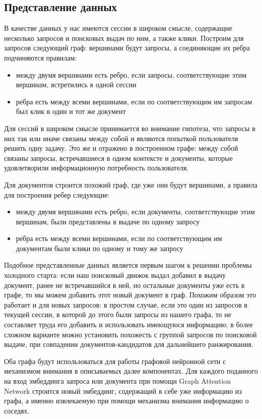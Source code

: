 \documentclass[diploma]{nanolab2015}
\begin{document}
\subsection{Представление данных}
В качестве данных у нас имеются сессии в широком смысле, содержащие несколько запросов и поисковых выдач по ним, а также клики. Построим для запросов следующий граф: вершинами будут запросы, а соединяющие их ребра подчиняются правилам:
\begin{itemize}
    \item между двумя вершинами есть ребро, если запросы, соответствующие этим вершинам, встретились в одной сессии
    \item ребра есть между всеми вершинами, если по соответствующим им запросам был клик в один и тот же документ
\end{itemize}

Для сессий в широком смысле принимается во внимание гипотеза, что запросы в них так или иначе связаны между собой и являются попыткой пользователя решить одну задачу. Это же и отражено в построенном графе: между собой связаны запросы, встречавшиеся в одном контексте и документы, которые удовлетворили информационную потребность пользователя.

Для документов строится похожий граф, где уже они будут вершинами, а правила для построения ребер следующие:
\begin{itemize}
    \item между двумя вершинами есть ребро, если документы, соответствующие этим вершинам, были представлены в выдаче по одному запросу
    \item ребра есть между всеми вершинами, если по соответствующим им документам были клики по одному и тому же запросу
\end{itemize}

Подобное представленные данных является первым шагом к решении проблемы холодного старта: если наш поисковый движок выдал добавил в выдачу документ, ранее не встречавшийся в ней, но остальные документы уже есть в графе, то мы можем добавить этот новый документ в граф. Похожим образом это работает и для новых запросов: в простом случае, если это один из запросов в текущей сессии, в которой до этого были запросы из нашего графа, то не составляет труда его добавить и использовать имеющуюся информацию; в более сложном варианте можно установить похожесть с группой запросов по поисковой выдаче, при совпадении документов-кандидатов для дальнейшего ранжирования.

Оба графа будут использоваться для работы графовой нейронной сети с механизмом внимания \cite{GAT} в описываемых далее компонентах. Для каждого поданного на вход эмбеддинга запроса или документа при помощи Graph Attention Network строится новый эмбеддинг, содержащий в себе уже информацию из графа, а именно извлекаемую при помощи механизма внимания \cite{Attention} информацию о соседях.
\end{document}
